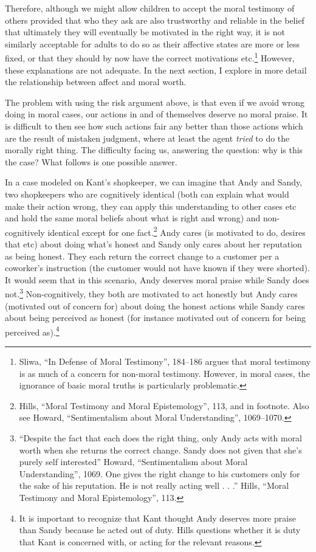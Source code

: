 \documentclass[phdthesis,12pt,final,a4paper]{wuthesis}
\theoremstyle{definition}
\theoremstyle{definition}
\theoremstyle{definition}
\theoremstyle{definition}
\theoremstyle{remark}
\begin{document}
Therefore, although we might allow children to accept the moral testimony of others provided that who they ask are also trustworthy and reliable in the belief that ultimately they will eventually be motivated in the right way, it is not similarly acceptable for adults to do so as their affective states are more or less fixed, or that they should by now have the correct motivations etc.\footnote{Sliwa, {``In Defense of Moral Testimony''}, 184--186 argues that moral testimony is as much of a concern for non-moral testimony. However, in moral cases, the ignorance of basic moral truths is particularly problematic.} However, these explanations are not adequate. In the next section, I explore in more detail the relationship between affect and moral worth.

The problem with using the risk argument above, is that even if we avoid wrong doing in moral cases, our actions in and of themselves deserve no moral praise. It is difficult to then see how such actions fair any better than those actions which are the result of mistaken judgment, where at least the agent \emph{tried} to do the morally right thing. The difficulty facing us, answering the question: why is this the case? What follows is one possible answer.

In a case modeled on Kant's shopkeeper, we can imagine that Andy and Sandy, two shopkeepers who are cognitively identical (both can explain what would make their action wrong, they can apply this understanding to other cases etc and hold the same moral beliefs about what is right and wrong) and non-cognitively identical except for one fact.\footnote{Hills, {``Moral Testimony and Moral Epistemology''}, 113, and in footnote. Also see Howard, {``Sentimentalism about {Moral Understanding}''}, 1069--1070.} Andy cares (is motivated to do, desires that etc) about doing what's honest and Sandy only cares about her reputation as being honest. They each return the correct change to a customer per a coworker's instruction (the customer would not have known if they were shorted). It would seem that in this scenario, Andy deserves moral praise while Sandy does not.\footnote{``Despite the fact that each does the right thing, only Andy acts with moral worth when she returns the correct change. Sandy does not given that she's purely self interested'' Howard, {``Sentimentalism about {Moral Understanding}''}, 1069. One gives the right change to his customers only for the sake of his reputation. He is not really acting well . . .'' Hills, {``Moral Testimony and Moral Epistemology''}, 113.} Non-cognitively, they both are motivated to act honestly but Andy cares (motivated out of concern for) about doing the honest actions while Sandy cares about being perceived as honest (for instance motivated out of concern for being perceived as).\footnote{It is important to recognize that Kant thought Andy deserves more praise than Sandy because he acted out of duty. Hills questions whether it is duty that Kant is concerned with, or acting for the relevant reasons.}
\end{document}
